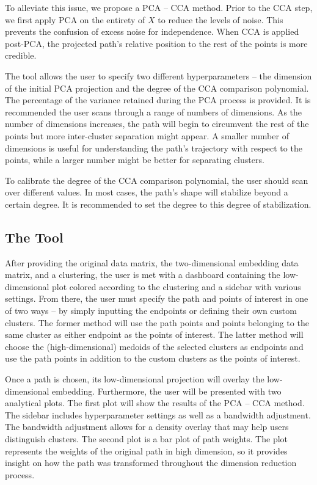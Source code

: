 \documentclass{article}
\begin{document}
To alleviate this issue, we propose a PCA -- CCA method. Prior to the CCA step, we first apply PCA on the entirety of $X$ to reduce the levels of noise. This prevents the confusion of excess noise for independence. When CCA is applied post-PCA, the projected path's relative position to the rest of the points is more credible.

The tool allows the user to specify two different hyperparameters -- the dimension of the initial PCA projection and the degree of the CCA comparison polynomial. The percentage of the variance retained during the PCA process is provided. It is recommended the user scans through a range of numbers of dimensions. As the number of dimensions increases, the path will begin to circumvent the rest of the points but more inter-cluster separation might appear. A smaller number of dimensions is useful for understanding the path's trajectory with respect to the points, while a larger   number might be better for separating clusters.

To calibrate the degree of the CCA comparison polynomial, the user should scan over different values. In most cases, the path's shape will stabilize beyond a certain degree. It is recommended to set the degree to this degree of stabilization.

\subsection{The Tool}
After providing the original data matrix, the two-dimensional embedding data matrix, and a clustering, the user is met with a dashboard containing the low-dimensional plot colored according to the clustering and a sidebar with various settings. From there, the user must specify the path and points of interest in one of two ways -- by simply inputting the endpoints or defining their own custom clusters. The former method will use the path points and points belonging to the same cluster as either endpoint as the points of interest. The latter method will choose the (high-dimensional) medoids of the selected clusters as endpoints and use the path points in addition to the custom clusters as the points of interest.

Once a path is chosen, its low-dimensional projection will overlay the low-dimensional embedding. Furthermore, the user will be presented with two analytical plots. The first plot will show the results of the PCA -- CCA method. The sidebar includes hyperparameter settings as well as a bandwidth adjustment. The bandwidth adjustment allows for a density overlay that may help users distinguish clusters. The second plot is a bar plot of path weights. The plot represents the weights of the original path in high dimension, so it provides insight on how the path was transformed throughout the dimension reduction process.
\end{document}
